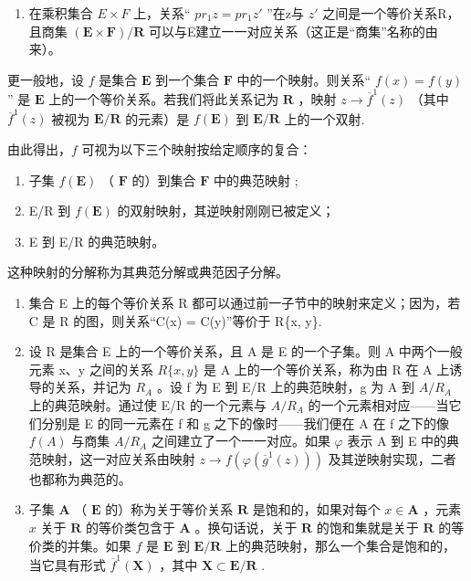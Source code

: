 \begin{enumerate}
\def\labelenumi{\arabic{enumi}.}
\setcounter{enumi}{2}
\tightlist
\item
  在乘积集合 \(E \times F\) 上，关系“ \(pr_{1}z = pr_{1}z'\) ”在z与 \(z'\) 之间是一个等价关系R，且商集 \((\mathbf{E} \times \mathbf{F}) / \mathbf{R}\) 可以与E建立一一对应关系（这正是“商集”名称的由来）。
\end{enumerate}

更一般地，设 \(f\) 是集合 \(\mathbf{E}\) 到一个集合 \(\mathbf{F}\) 中的一个映射。则关系“ \(f(x) = f(y)\) '' 是 \(\mathbf{E}\) 上的一个等价关系。若我们将此关系记为 \(\mathbf{R}\) ，映射 \(z \to \overline{f}^1(z)\) （其中 \(\overline{f}^1(z)\) 被视为 \(\mathbf{E}/\mathbf{R}\) 的元素）是 \(f(\mathbf{E})\) 到 \(\mathbf{E}/\mathbf{R}\) 上的一个双射.

由此得出，\(f\) 可视为以下三个映射按给定顺序的复合：

\begin{enumerate}
\def\labelenumi{(\arabic{enumi})}
\item
  子集 \(f(\mathbf{E})\) （ \(\mathbf{F}\) 的）到集合 \(\mathbf{F}\) 中的典范映射 ;
\item
  E/R 到 \(f(\mathbf{E})\) 的双射映射，其逆映射刚刚已被定义；
\item
  E 到 E/R 的典范映射。
\end{enumerate}

这种映射的分解称为其典范分解或典范因子分解。

\begin{enumerate}
\def\labelenumi{\arabic{enumi}.}
\setcounter{enumi}{3}
\item
  集合 E 上的每个等价关系 R 都可以通过前一子节中的映射来定义；因为，若 C 是 R 的图，则关系“C(x) = C(y)”等价于 R\{x, y\}.
\item
  设 R 是集合 E 上的一个等价关系，且 A 是 E 的一个子集。则 A 中两个一般元素 x、y 之间的关系 \(R\{x, y\}\) 是 A 上的一个等价关系，称为由 R 在 A 上诱导的关系，并记为 \(R_{A}\) 。设 f 为 E 到 E/R 上的典范映射，g 为 A 到 \(A/R_{A}\) 上的典范映射。通过使 E/R 的一个元素与 \(A/R_{A}\) 的一个元素相对应——当它们分别是 E 的同一元素在 f 和 g 之下的像时——我们便在 A 在 f 之下的像 \(f(A)\) 与商集 \(A/R_{A}\) 之间建立了一个一一对应。如果 \(\varphi\) 表示 A 到 E 中的典范映射，这一对应关系由映射 \(z \to f(\varphi(\overline{g}^1(z)))\) 及其逆映射实现，二者也都称为典范的。
\item
  子集 \(\mathbf{A}\) （ \(\mathbf{E}\) 的）称为关于等价关系 \(\mathbf{R}\) 是饱和的，如果对每个 \(x \in \mathbf{A}\) ，元素 \(x\) 关于 \(\mathbf{R}\) 的等价类包含于 \(\mathbf{A}\) 。换句话说，关于 \(\mathbf{R}\) 的饱和集就是关于 \(\mathbf{R}\) 的等价类的并集。如果 \(f\) 是 \(\mathbf{E}\) 到 \(\mathbf{E} / \mathbf{R}\) 上的典范映射，那么一个集合是饱和的，当它具有形式 \(\overline{f}^1(\mathbf{X})\) ，其中 \(\mathbf{X} \subset \mathbf{E} / \mathbf{R}\) .
\end{enumerate}

